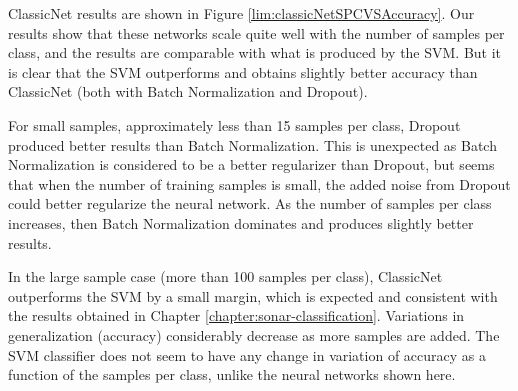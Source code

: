ClassicNet results are shown in Figure \ref{lim:classicNetSPCVSAccuracy}. Our results show that these networks scale quite well with the number of samples per class, and the results are comparable with what is produced by the SVM. But it is clear that the SVM outperforms and obtains slightly better accuracy than ClassicNet (both with Batch Normalization and Dropout).

For small samples, approximately less than 15 samples per class, Dropout produced better results than Batch Normalization. This is unexpected as Batch Normalization is considered to be a better regularizer than Dropout, but seems that when the number of training samples is small, the added noise from Dropout could better regularize the neural network. As the number of samples per class increases, then Batch Normalization dominates and produces slightly better results.

In the large sample case (more than 100 samples per class), ClassicNet outperforms the SVM by a small margin, which is expected and consistent with the results obtained in Chapter \ref{chapter:sonar-classification}. Variations in generalization (accuracy) considerably decrease as more samples are added. The SVM classifier does not seem to have any change in variation of accuracy as a function of the samples per class, unlike the neural networks shown here.


